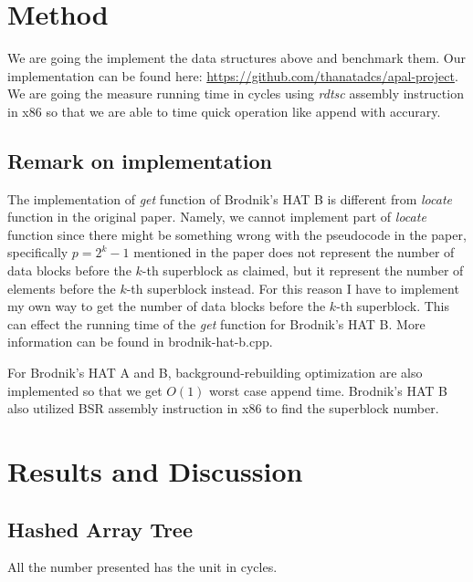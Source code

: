 \documentclass{article} %
\begin{document}
    \section*{Method}
    We are going the implement the data structures above and benchmark them. Our implementation can be found here: \href{https://github.com/thanatadcs/apal-project}{ https://github.com/thanatadcs/apal-project}.
    We are going the measure running time in cycles using
    \emph{rdtsc} assembly instruction in x86 so that we are able to time quick operation like append with accurary.

    \subsection*{Remark on implementation}
    The implementation of \emph{get} function of Brodnik's HAT B is different from \emph{locate} function in the original paper.
    Namely, we cannot implement part of \emph{locate} function since there might be something wrong with the pseudocode in the paper,
    specifically \emph{$p=2^k - 1$} mentioned in the paper does not represent the number of data blocks before the $k$-th superblock as claimed,
    but it represent the number of elements before the $k$-th superblock instead. For this reason I have to implement my own way to get the number of
    data blocks before the $k$-th superblock. This can effect the running time of the \emph{get} function for Brodnik's HAT B. More information can be found in brodnik-hat-b.cpp.

    For Brodnik's HAT A and B, background-rebuilding optimization are also implemented so that we get $O(1)$ worst case append time. Brodnik's HAT B also utilized BSR assembly instruction in x86 to find
    the superblock number.

    \section*{Results and Discussion}
    \subsection*{Hashed Array Tree}
    All the number presented has the unit in cycles.
\end{document}
